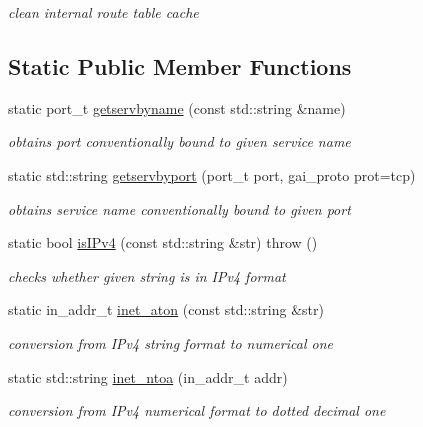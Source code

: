 \begin{CompactItemize}
\begin{CompactList}\small\item\em clean internal route table cache \item\end{CompactList}\end{CompactItemize}
\subsection*{Static Public Member Functions}
\begin{CompactItemize}
\item 
static port\_\-t \hyperlink{classsocketpp_1_1AddrHandler_aa24239225e2a35cce9322dfa68bf438}{getservbyname} (const std::string \&name)
\begin{CompactList}\small\item\em obtains port conventionally bound to given service name \item\end{CompactList}\item 
static std::string \hyperlink{classsocketpp_1_1AddrHandler_c099c4bdf0b45e5d4a1e5806d896768e}{getservbyport} (port\_\-t port, gai\_\-proto prot=tcp)
\begin{CompactList}\small\item\em obtains service name conventionally bound to given port \item\end{CompactList}\item 
static bool \hyperlink{classsocketpp_1_1AddrHandler_652e24c273f7905cebf8d04b3cfef74d}{isIPv4} (const std::string \&str)  throw ()
\begin{CompactList}\small\item\em checks whether given string is in IPv4 format \item\end{CompactList}\item 
static in\_\-addr\_\-t \hyperlink{classsocketpp_1_1AddrHandler_e2eda37cd4c20059c557e4e65c829cf8}{inet\_\-aton} (const std::string \&str)
\begin{CompactList}\small\item\em conversion from IPv4 string format to numerical one \item\end{CompactList}\item 
static std::string \hyperlink{classsocketpp_1_1AddrHandler_a4377d84c8ea976aeada2b2eb0ac248d}{inet\_\-ntoa} (in\_\-addr\_\-t addr)
\begin{CompactList}\small\item\em conversion from IPv4 numerical format to dotted decimal one \item\end{CompactList}\end{CompactItemize}


